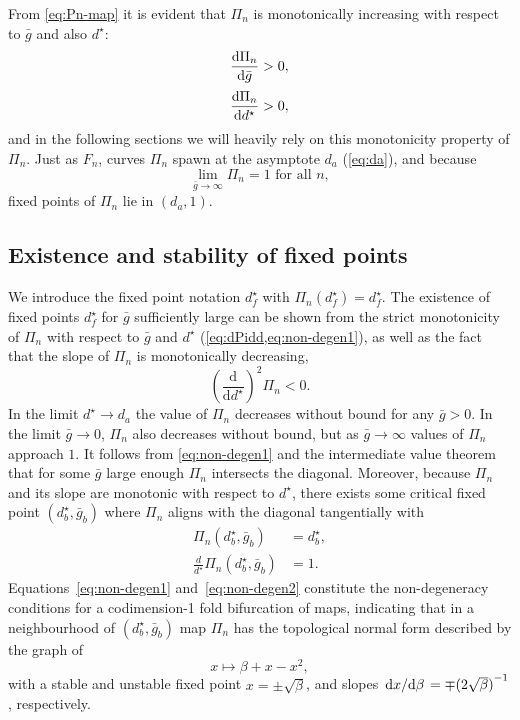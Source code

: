 From \cref{eq:Pn-map} it is evident that $\Pi_n$ is monotonically increasing with respect to $\bar g$ and also $d^\star$:
\begin{align}
	\label{eq:non-degen1}
	\dv{\Pi_n}{\bar g}  & >0, \\[0.5ex]
	\label{eq:dPidd}
	\dv{\Pi_n}{d^\star} & >0,
\end{align}
and in the following sections we will heavily rely on this monotonicity property of $\Pi_n$.
Just as $F_n$, curves $\Pi_n$ spawn at the asymptote $d_{a}$ (\cref{eq:da}), and because
\begin{equation}
	\lim_{\bar g \to \infty}\Pi_n = 1\text{ for all }n,
\end{equation}
fixed points of $\Pi_n$ lie in $(d_{a}, 1)$.

\subsection{Existence and stability of fixed points}
We introduce the fixed point notation $d^\star_{f}$ with $\Pi_n(d^\star_{f})=d^\star_{f}$.
The existence of fixed points $d^\star_{f}$ for $\bar g$ sufficiently large can be shown from the strict monotonicity of $\Pi_{n}$ with respect to $\bar g$ and $d^\star$ (\cref{eq:dPidd,eq:non-degen1}), as well as the fact that the slope of $\Pi_{n}$ is monotonically decreasing,
\begin{equation}
	\label{eq:non-degen2}
	\left(\frac{\mathrm{d}}{\mathrm{d}d^\star}\right)^2 \Pi_n<0.
\end{equation}
In the limit $d^\star \to d_{a}$ the value of $\Pi_n$ decreases without bound for any $\bar g>0$.
In the limit $\bar g\to 0$, $\Pi_n$ also decreases without bound, but as $\bar g\to \infty$ values of $\Pi_n$ approach $1$.
It follows from \cref{eq:non-degen1} and the intermediate value theorem that for some $\bar g$ large enough $\Pi_n$ intersects the diagonal.
Moreover, because $\Pi_n$ and its slope are monotonic with respect to $d^\star$, there exists some critical fixed point $(d^\star_b, \bar g_b)$ where $\Pi_n$ aligns with the diagonal tangentially with
\begin{align}
	\Pi_n(d^\star_b, \bar g_b)                  & =d^\star_b, \\
	\frac{d}{d^\star}\Pi_n(d^\star_b, \bar g_b) & =1.
\end{align}
Equations~\eqref{eq:non-degen1} and~\eqref{eq:non-degen2} constitute the non-degeneracy conditions for a codimension-1 fold bifurcation of maps, indicating that in a neighbourhood of $(d^\star_{b}, \bar g_{b})$ map $\Pi_n$ has the topological normal form described by the graph of
\begin{equation}
	\label{eq:normal-form}
	x\mapsto \beta+x-x^{2},
\end{equation}
with a stable and unstable fixed point $x=\pm\sqrt{\beta}$, and slopes $\dv*{x}{\beta}=\mp {(2\sqrt{\beta})}^{-1}$, respectively.

